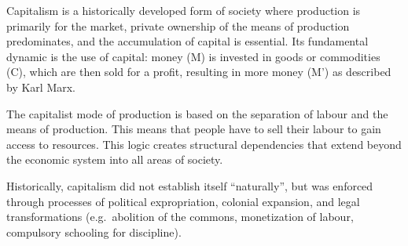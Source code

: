 \documentclass[
  a4paper,
  openany]{book}
\begin{document}
\begin{tcolorbox}[enhanced jigsaw, left=2mm, arc=.35mm, titlerule=0mm, opacityback=0, leftrule=.75mm, title={What is capitalism?}, breakable, bottomtitle=1mm, rightrule=.15mm, coltitle=black, toptitle=1mm, bottomrule=.15mm, colback=white, opacitybacktitle=0.6, colbacktitle=quarto-callout-note-color!10!white, toprule=.15mm, colframe=quarto-callout-note-color-frame]

Capitalism is a historically developed form of society where production
is primarily for the market, private ownership of the means of
production predominates, and the accumulation of capital is essential.
Its fundamental dynamic is the use of capital: money (M) is invested in
goods or commodities (C), which are then sold for a profit, resulting in
more money (M') as described by Karl Marx.

The capitalist mode of production is based on the separation of labour
and the means of production. This means that people have to sell their
labour to gain access to resources. This logic creates structural
dependencies that extend beyond the economic system into all areas of
society.

Historically, capitalism did not establish itself ``naturally'', but was
enforced through processes of political expropriation, colonial
expansion, and legal transformations (e.g.~abolition of the commons,
monetization of labour, compulsory schooling for discipline).

\end{tcolorbox}
\end{document}

